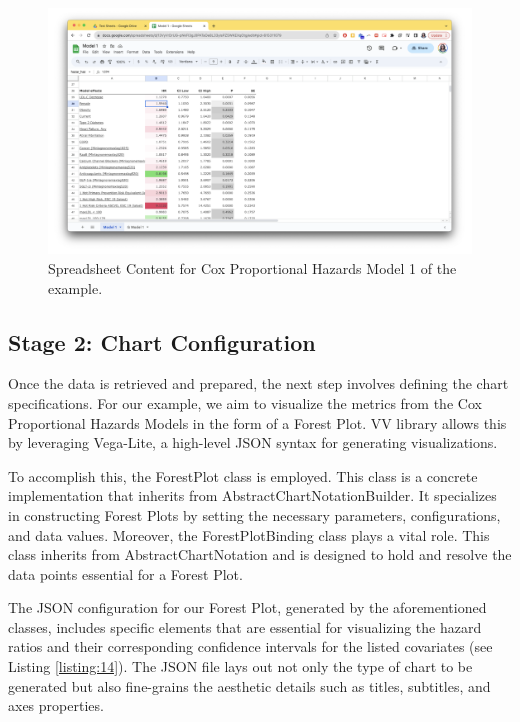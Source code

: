 \begin{figure}[ht]
  \centering
  \includegraphics[width=\textwidth]{media/fig14.png}
  \caption{Spreadsheet Content for Cox Proportional Hazards Model 1 of
  the example.}
  \label{fig:ss}
\end{figure}

\subsection{Stage 2: Chart
Configuration}\label{stage-2-chart-configuration}

Once the data is retrieved and prepared, the next step involves defining
the chart specifications. For our example, we aim to visualize the
metrics from the Cox Proportional Hazards Models in the form of a Forest
Plot. VV library allows this by leveraging Vega-Lite, a high-level JSON
syntax for generating visualizations.

To accomplish this, the ForestPlot class is employed. This class is a
concrete implementation that inherits from AbstractChartNotationBuilder.
It specializes in constructing Forest Plots by setting the necessary
parameters, configurations, and data values. Moreover, the
ForestPlotBinding class plays a vital role. This class inherits from
AbstractChartNotation and is designed to hold and resolve the data
points essential for a Forest Plot.

The JSON configuration for our Forest Plot, generated by the
aforementioned classes, includes specific elements that are essential
for visualizing the hazard ratios and their corresponding confidence
intervals for the listed covariates (see Listing \ref{listing:14}). The JSON file lays
out not only the type of chart to be generated but also fine-grains the
aesthetic details such as titles, subtitles, and axes properties.

